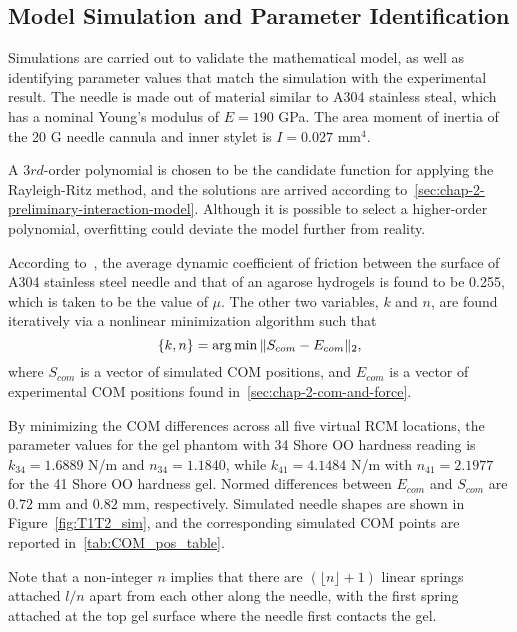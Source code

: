 \subsection{Model Simulation and Parameter Identification}
\label{sec:chap-2-simulation-and-parameter-identification}
Simulations are carried out to validate the mathematical model, as well as identifying parameter values that match the simulation with the experimental result. The needle is made out of material similar to A304 stainless steal, which has a nominal Young's modulus of $E = 190$ GPa. The area moment of inertia of the 20 G needle cannula and inner stylet is $I = 0.027$ mm$^4$.

A $3rd$-order polynomial is chosen to be the candidate function for applying the Rayleigh-Ritz method, and the solutions are arrived according to~\cref{sec:chap-2-preliminary-interaction-model}. Although it is possible to select a higher-order polynomial, overfitting could deviate the model further from reality.

According to~\parencite{urreaEvaluationFrictionCoefficient2016}, the average dynamic coefficient of friction between the surface of A304 stainless steel needle and that of an agarose hydrogels is found to be 0.255, which is taken to be the value of $\mu$. The other two variables, $k$ and $n$, are found iteratively via a nonlinear minimization algorithm such that
\begin{equation}
  \left\{k, n\right\} = \operatorname*{arg\,min} {\|S_{com} - E_{com}\|_2},
\end{equation}
where $S_{com}$ is a vector of simulated COM positions, and $E_{com}$ is a vector of experimental COM positions found in~\cref{sec:chap-2-com-and-force}.

By minimizing the COM differences across all five virtual RCM locations, the parameter values for the gel phantom with 34 Shore OO hardness reading is $k_{34} = 1.6889$ N/m and $n_{34} = 1.1840$, while $k_{41} = 4.1484$ N/m with $n_{41} = 2.1977$ for the 41 Shore OO hardness gel. Normed differences between $E_{com}$ and $S_{com}$ are $0.72$ mm and $0.82$ mm, respectively. Simulated needle shapes are shown in Figure~\ref{fig:T1T2_sim}, and the corresponding simulated COM points are reported in~\cref{tab:COM_pos_table}.

Note that a non-integer $n$ implies that there are $(\lfloor n \rfloor + 1)$ linear springs attached $l/n$ apart from each other along the needle, with the first spring attached at the top gel surface where the needle first contacts the gel.

